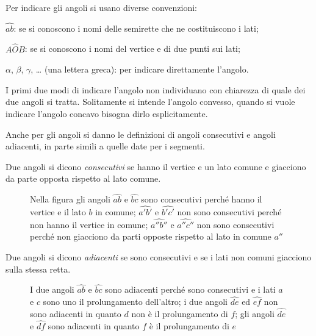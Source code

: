 Per indicare gli angoli si usano diverse convenzioni:
\begin{itemize*}
\item  $\widehat{ab}$: se si conoscono i nomi delle semirette che ne 
costituiscono i lati;
\item  $A\widehat{O}B$: se si conoscono i nomi del vertice e di due 
punti sui lati;
\item  $\alpha$, $\beta$, $\gamma$, \ldots{} (una lettera greca): per 
indicare direttamente l'angolo.
\end{itemize*}
I primi due modi di indicare l'angolo non individuano con chiarezza 
di quale dei due angoli si tratta. Solitamente si intende l'angolo 
convesso, quando si vuole indicare l'angolo concavo bisogna dirlo 
esplicitamente.

Anche per gli angoli si danno le definizioni di angoli consecutivi e 
angoli adiacenti, in parte simili a quelle date per i segmenti.

\begin{definizione}
Due angoli si dicono \emph{consecutivi} se hanno il vertice e un lato 
comune e giacciono da parte opposta rispetto al lato comune.
\end{definizione}


\begin{inaccessibleblock}
 \begin{figure}[htb]
 \centering 
\caption{Nella figura gli angoli  $\widehat{ab}$ e $\widehat{bc}$  
sono consecutivi perché hanno il vertice e il lato $ b $ in comune;  
$\widehat {a'b'}$ e $\widehat {b'c'}$  non sono consecutivi perché 
non hanno il vertice in comune;  $\widehat {a''b''}$ e $\widehat 
{a''c''}$ non sono consecutivi perché non giacciono da parti opposte 
rispetto al lato in comune $a''$}\label{fig:1.22}
\end{figure}
\end{inaccessibleblock}

\begin{definizione}
Due angoli si dicono \emph{adiacenti} se sono consecutivi e se i lati 
non comuni giacciono sulla stessa retta.
\end{definizione}


\begin{inaccessibleblock}
 \begin{figure}[htb]
 \centering 
\caption{I due angoli $\widehat{ab}$ e $\widehat{bc}$ sono adiacenti 
perché sono consecutivi e i lati $a$ e $c$ sono uno il prolungamento 
dell'altro; i due angoli $\widehat{de}$ ed $\widehat{ef}$ non sono 
adiacenti in quanto $d$ non è il prolungamento di $f$; gli angoli 
$\widehat{de}$ e $\widehat{df}$ sono adiacenti in quanto $f$ è il 
prolungamento di $e$}\label{fig:1.23}
\end{figure}
\end{inaccessibleblock}

